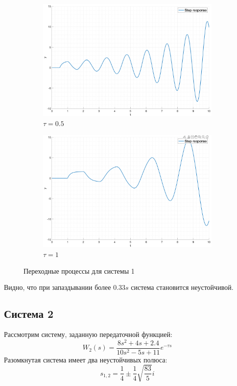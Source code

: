 \begin{figure}[ht!]
\begin{subfigure}{0.5\textwidth}
        \includegraphics[width=\textwidth]{media/plots/task6_step_response_closed_3.png}
        \caption{$\tau = 0.5$}
    \end{subfigure}
    \begin{subfigure}{0.5\textwidth}
        \centering
        \includegraphics[width=\textwidth]{media/plots/task6_step_response_closed_4.png}
        \caption{$\tau = 1$}
    \end{subfigure}
    \caption{Переходные процессы для системы 1}
    \label{fig:task6_step}
\end{figure}

Видно, что при запаздывании более $0.33s$ система становится неустойчивой. 

\FloatBarrier
\subsection{Система 2}
Рассмотрим систему, заданную передаточной функцией:
\begin{equation}
    W_2(s) = \frac{8s^2 + 4s + 2.4}{10s^2 - 5s + 11} e^{-\tau s}
\end{equation}
Разомкнутая система имеет два неустойчивых полюса:
\begin{equation}
    s_{1,2} = \frac{1}{4} \pm \frac{1}{4}\sqrt{\frac{83}{5}}i
\end{equation}

